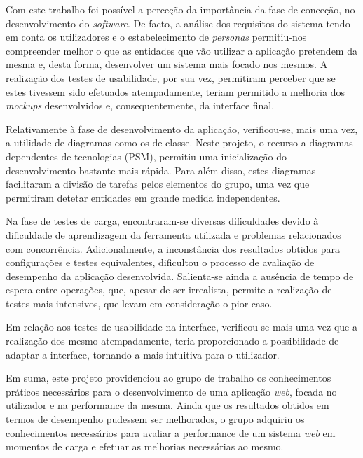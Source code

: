 

Com este trabalho foi possível a perceção da importância da fase de conceção, no desenvolvimento do \textit{software}. De facto, a análise dos requisitos do sistema tendo em conta os utilizadores e o estabelecimento de \textit{personas} permitiu-nos compreender melhor o que as entidades que vão utilizar a aplicação pretendem da mesma e, desta forma, desenvolver um sistema mais focado nos mesmos. A realização dos testes de usabilidade, por sua vez, permitiram perceber que se estes tivessem sido efetuados atempadamente, teriam permitido a melhoria dos \textit{mockups} desenvolvidos e, consequentemente, da interface final. 

Relativamente à fase de desenvolvimento da aplicação, verificou-se, mais uma vez, a utilidade de diagramas como os de classe. Neste projeto, o recurso a diagramas dependentes de tecnologias (PSM), permitiu uma inicialização do desenvolvimento bastante mais rápida. Para além disso, estes diagramas facilitaram a divisão de tarefas pelos elementos do grupo, uma vez que permitiram detetar entidades em grande medida independentes. 

Na fase de testes de carga, encontraram-se diversas dificuldades devido à dificuldade de aprendizagem da ferramenta utilizada e problemas relacionados com concorrência. Adicionalmente, a inconstância dos resultados obtidos para configurações e testes equivalentes, dificultou o processo de avaliação de desempenho da aplicação desenvolvida. Salienta-se ainda a ausência de tempo de espera entre operações, que, apesar de ser irrealista, permite a realização de testes mais intensivos, que levam em consideração o pior caso.

Em relação aos testes de usabilidade na interface, verificou-se mais uma vez que a realização dos mesmo atempadamente, teria proporcionado a possibilidade de adaptar a interface, tornando-a mais intuitiva para o utilizador.

Em suma, este projeto providenciou ao grupo de trabalho os conhecimentos práticos necessários para o desenvolvimento de uma aplicação \textit{web}, focada no utilizador e na performance da mesma. Ainda que os resultados obtidos em termos de desempenho pudessem ser melhorados, o grupo adquiriu os conhecimentos necessários para avaliar a performance de um sistema \textit{web} em momentos de carga e efetuar as melhorias necessárias ao mesmo.
